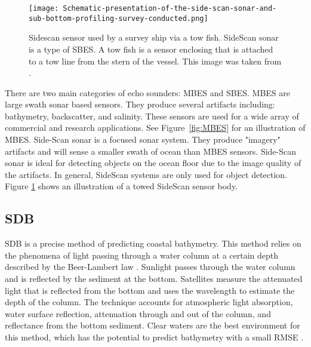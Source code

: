 \begin{figure}[htp]
    \centering
    \texttt{[image: Schematic-presentation-of-the-side-scan-sonar-and-sub-bottom-profiling-survey-conducted.png]}
    \caption{Sidescan sensor used by a survey ship via a tow fish.
    SideScan sonar is a type of \ac{SBES}.
    A tow fish is a sensor enclosing that is attached to a tow line from the stern of the vessel.
    This image was taken from \cite{sakellariou2015preliminary}.}
    \label{fig:sidescandemo}
\end{figure}


There are two main categories of echo sounders: \ac{MBES} and \ac{SBES}.
\ac{MBES} are large swath sonar based sensors.
They produce several artifacts including: bathymetry, backscatter, and salinity.
These sensors are used for a wide array of commercial and research applications.
See Figure~\ref{fig:MBES} for an illustration of \ac{MBES}.
Side-Scan sonar is a focused sonar system.
They produce "imagery" artifacts and will sense a smaller swath of ocean than \ac{MBES} sensors.
Side-Scan sonar is ideal for detecting objects on the ocean floor due to the image quality of the artifacts.
In general, SideScan systems are only used for object detection.
Figure \ref{fig:sidescandemo} shows an illustration of a towed SideScan sensor body.




\subsection{\acf{SDB}}
\ac{SDB} is a precise method of predicting coastal bathymetry. 
This method relies on the phenomena of light passing through a water column at a certain depth described by the Beer-Lambert law \cite{chybicki2018three}\cite{vinayaraj2016satellite}.
Sunlight passes through the water column and is reflected by the sediment at the bottom.
Satellites measure the attenuated light that is reflected from the bottom and uses the wavelength to estimate the depth of the column.
The technique accounts for atmospheric light absorption, water surface reflection, attenuation through and out of the column, and reflectance from the bottom sediment.
Clear waters are the best environment for this method, which has the potential to predict bathymetry with a small RMSE \cite{chybicki2018three}.


